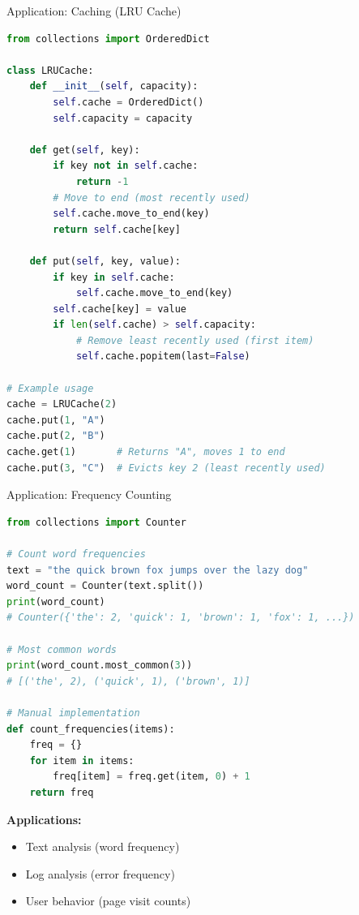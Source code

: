 \documentclass[aspectratio=169]{beamer}
\begin{document}
\begin{frame}[fragile]{Application: Caching (LRU Cache)}
  \begin{lstlisting}[language=Python, basicstyle=\ttfamily\footnotesize]
from collections import OrderedDict

class LRUCache:
    def __init__(self, capacity):
        self.cache = OrderedDict()
        self.capacity = capacity

    def get(self, key):
        if key not in self.cache:
            return -1
        # Move to end (most recently used)
        self.cache.move_to_end(key)
        return self.cache[key]

    def put(self, key, value):
        if key in self.cache:
            self.cache.move_to_end(key)
        self.cache[key] = value
        if len(self.cache) > self.capacity:
            # Remove least recently used (first item)
            self.cache.popitem(last=False)

# Example usage
cache = LRUCache(2)
cache.put(1, "A")
cache.put(2, "B")
cache.get(1)       # Returns "A", moves 1 to end
cache.put(3, "C")  # Evicts key 2 (least recently used)
  \end{lstlisting}
\end{frame}

\begin{frame}[fragile]{Application: Frequency Counting}
  \begin{lstlisting}[language=Python, basicstyle=\ttfamily\small]
from collections import Counter

# Count word frequencies
text = "the quick brown fox jumps over the lazy dog"
word_count = Counter(text.split())
print(word_count)
# Counter({'the': 2, 'quick': 1, 'brown': 1, 'fox': 1, ...})

# Most common words
print(word_count.most_common(3))
# [('the', 2), ('quick', 1), ('brown', 1)]

# Manual implementation
def count_frequencies(items):
    freq = {}
    for item in items:
        freq[item] = freq.get(item, 0) + 1
    return freq
  \end{lstlisting}

  \vspace{0.3cm}
  \textbf{Applications:}
  \begin{itemize}
    \item Text analysis (word frequency)
    \item Log analysis (error frequency)
    \item User behavior (page visit counts)
  \end{itemize}
\end{frame}
\end{document}
